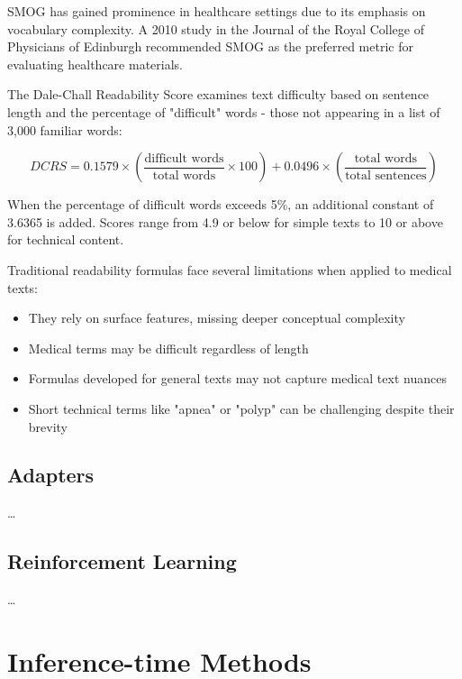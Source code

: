 SMOG has gained prominence in healthcare settings due to its emphasis on vocabulary complexity. A 2010 study in the Journal of the Royal College of Physicians of Edinburgh recommended SMOG as the preferred metric for evaluating healthcare materials.

The Dale-Chall Readability Score examines text difficulty based on sentence length and the percentage of "difficult" words - those not appearing in a list of 3,000 familiar words:

\begin{equation}
    DCRS = 0.1579 \times \left(\frac{\text{difficult words}}{\text{total words}} \times 100\right) + 0.0496 \times \left(\frac{\text{total words}}{\text{total sentences}}\right)
\end{equation}

When the percentage of difficult words exceeds 5\%, an additional constant of 3.6365 is added. Scores range from 4.9 or below for simple texts to 10 or above for technical content.

Traditional readability formulas face several limitations when applied to medical texts:

\begin{itemize}
    \item They rely on surface features, missing deeper conceptual complexity
    \item Medical terms may be difficult regardless of length
    \item Formulas developed for general texts may not capture medical text nuances
    \item Short technical terms like "apnea" or "polyp" can be challenging despite their brevity
\end{itemize}



\subsection{Adapters}
\dots

\subsection{Reinforcement Learning}
\dots

\section{Inference-time Methods}
\label{c2:s:inference-time}

